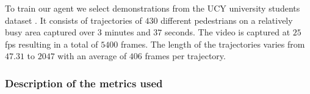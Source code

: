 To train our agent we select demonstrations from the UCY university students dataset \cite{lerner_crowds_by_example_2007}. It consists of trajectories of $430$ different pedestrians on a relatively busy area captured over $3$ minutes and $37$ seconds. The video is captured at $25$ fps resulting in a total of $5400$ frames. The length of the trajectories varies from $47.31$  to $2047$ with an average of $406$ frames per trajectory. 

%            

\subsubsection*{Description of the metrics used}
%

